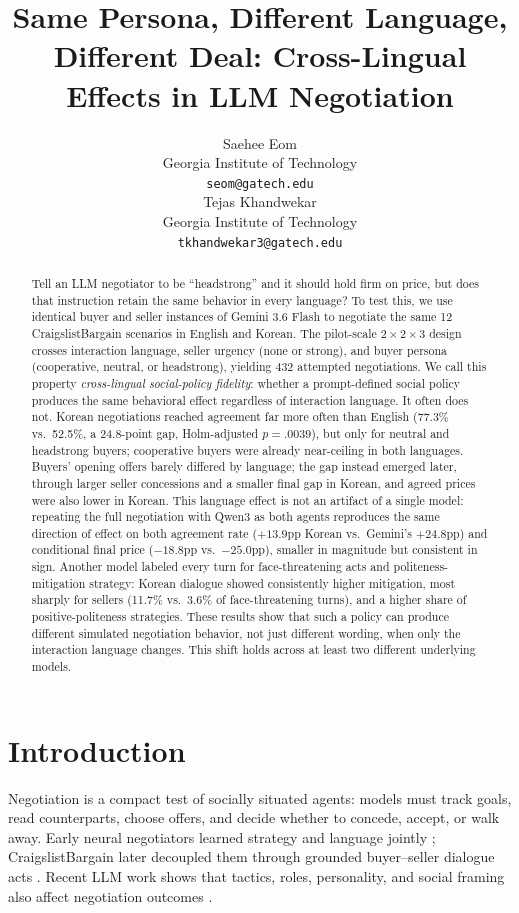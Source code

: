 \documentclass{article}
\title{Same Persona, Different Language, Different Deal: Cross-Lingual Effects in LLM Negotiation}
\author{%
  Saehee Eom \\
  Georgia Institute of Technology \\
  \texttt{seom@gatech.edu} \\
  \And
  Tejas Khandwekar \\
  Georgia Institute of Technology \\
  \texttt{tkhandwekar3@gatech.edu} \\
}
\begin{document}
\maketitle

\begin{abstract}
Tell an LLM negotiator to be ``headstrong'' and it should hold firm on
price, but does that instruction retain the same behavior in every language? To test this, we use identical buyer and seller instances of Gemini 3.6 Flash
to negotiate the same 12 CraigslistBargain scenarios in English and Korean.
The pilot-scale $2\times2\times3$ design crosses interaction language, seller
urgency (none or strong), and buyer persona (cooperative, neutral, or
headstrong), yielding 432 attempted negotiations. We call this property \emph{cross-lingual
social-policy fidelity}: whether a prompt-defined social policy produces the
same behavioral effect regardless of interaction language. It often does
not. Korean negotiations reached agreement far more often than English
(77.3\% vs.\ 52.5\%, a 24.8-point gap, Holm-adjusted $p=.0039$), but only for
neutral and headstrong buyers; cooperative buyers were already near-ceiling
in both languages. Buyers' opening offers barely differed by language; the
gap instead emerged later, through larger seller concessions and a smaller
final gap in Korean, and agreed prices were also lower in Korean. This
language effect is not an artifact of a single model: repeating the full
negotiation with Qwen3 as both agents reproduces the same direction of
effect on both agreement rate ($+13.9$pp Korean vs.\ Gemini's $+24.8$pp) and
conditional final price ($-18.8$pp vs.\ $-25.0$pp), smaller in magnitude but
consistent in sign. Another model labeled every turn for face-threatening acts and
politeness-mitigation strategy: Korean dialogue showed consistently higher
mitigation, most sharply for sellers (11.7\% vs.\ 3.6\% of face-threatening
turns), and a higher share of positive-politeness strategies. These results show that such a policy can produce
different simulated negotiation behavior, not just different wording, when only the
interaction language changes. This shift holds across at least two
different underlying models.
\end{abstract}

\section{Introduction}
Negotiation is a compact test of socially situated agents: models must track
goals, read counterparts, choose offers, and decide whether to concede,
accept, or walk away. Early neural negotiators learned strategy and language
jointly \citep{lewis2017deal}; CraigslistBargain later decoupled them through
grounded buyer--seller dialogue acts \citep{he2018decoupling}. Recent LLM work
shows that tactics, roles, personality, and social framing also affect
negotiation outcomes \citep{bianchi2024negotiationarena,kwon2024negotiators,
xia2024bargaining,huang2024personality,noh2026personalities,vaccaro2026advancing}.
\end{document}
